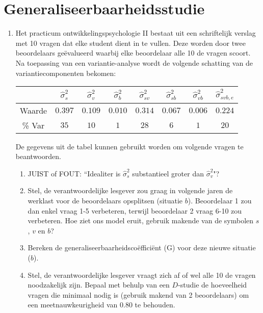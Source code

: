 
\OPGAVE
{
\section{Generaliseerbaarheidsstudie}

\begin{enumerate}

\item
Het practicum ontwikkelingspsychologie II bestaat uit een schriftelijk verslag met 10 vragen dat elke student dient in te vullen. Deze worden door twee beoordelaars ge\"{e}valueerd waarbij elke beoordelaar alle 10 de vragen scoort.\\ 
Na toepassing van een variantie-analyse wordt de volgende schatting van de variantiecomponenten bekomen:

\begin{center}
\renewcommand{\arraystretch}{1.2}
\begin{tabular}{|c|c|c|c|c|c|c|c|} \hline
 & $ \hat{\sigma}^2_{s} $ & $ \hat{\sigma}^2_{v} $& $ \hat{\sigma}^2_{b} $ & $ \hat{\sigma}^2_{sv} $ & $ \hat{\sigma}^2_{sb} $ & $ \hat{\sigma}^2_{vb} $ & $ \hat{\sigma}^2_{svb,e} $ \\ \hline
Waarde  & $ 0.397 $ & $ 0.109 $ & $ 0.010 $ & $ 0.314 $ & $ 0.067 $ & $ 0.006 $ & $ 0.224 $ \\ 
\% Var & $ 35 $ & $ 10 $ & $ 1 $ & $ 28 $ & $ 6 $ & $ 1 $ & $ 20 $ \\ \hline
\end{tabular}
\end{center}


\normalsize
De gegevens uit de tabel kunnen gebruikt worden om volgende vragen te beantwoorden.

\begin{enumerate}
\item JUIST of FOUT: ``Idealiter is $ \hat{\sigma}^2_{s} $ substantieel groter dan $ \hat{\sigma}^2_{v}$"?
\item Stel, de verantwoordelijke lesgever zou graag in volgende jaren de werklast voor de beoordelaars opsplitsen (situatie $b$). Beoordelaar 1 zou dan enkel vraag 1-5 verbeteren, terwijl beoordelaar 2 vraag 6-10 zou verbeteren. Hoe ziet ons model eruit, gebruik makende van de symbolen $s$, $v$ en $b$?
\item Bereken de generaliseerbaarheidsco\"{e}ffici\"{e}nt (G) voor deze nieuwe situatie ($b$).

\item Stel, de verantwoordelijke lesgever vraagt zich af of wel alle 10 de vragen noodzakelijk zijn. Bepaal met behulp van een $D$-studie de hoeveelheid vragen die minimaal nodig is (gebruik makend van 2 beoordelaars) om een meetnauwkeurigheid van 0.80 te behouden.


\end{enumerate}
\end{enumerate}
}

